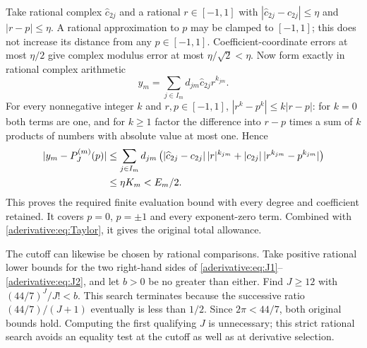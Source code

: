 \documentclass[11pt]{article}
\begin{document}
Take rational complex $\widehat c_{2j}$ and a rational
$r\in[-1,1]$ with
$|\widehat c_{2j}-c_{2j}|\le\eta$ and $|r-p|\le\eta$.
A rational approximation to $p$ may be clamped to $[-1,1]$;
this does not increase its distance from any $p\in[-1,1]$.
Coefficient-coordinate errors at most $\eta/2$ give
complex modulus error at most $\eta/\sqrt2<\eta$.
Now form exactly in rational complex arithmetic
\begin{equation}\label{aderivative:eq:rationaloutput}
y_m=\sum_{j\in I_m}d_{jm}\widehat c_{2j}r^{k_{jm}}.
\end{equation}
For every nonnegative integer $k$ and $r,p\in[-1,1]$,
$|r^k-p^k|\le k|r-p|$: for $k=0$ both terms are one,
and for $k\ge1$ factor the difference into $r-p$ times
a sum of $k$ products of numbers with absolute value at
most one. Hence
\begin{align}
|y_m-P_J^{(m)}(p)|
&\le\sum_{j\in I_m}d_{jm}
\left(|\widehat c_{2j}-c_{2j}|\,|r|^{k_{jm}}
+|c_{2j}|\,|r^{k_{jm}}-p^{k_{jm}}|\right)\notag\\
&\le\eta K_m<E_m/2.\label{aderivative:eq:evaluationbound}
\end{align}
This proves the required finite evaluation bound with
every degree and coefficient retained. It covers $p=0$,
$p=\pm1$ and every exponent-zero term. Combined with
\eqref{aderivative:eq:Taylor}, it gives the original total allowance.

The cutoff can likewise be chosen by rational comparisons.
Take positive rational lower bounds for the two right-hand
sides of \eqref{aderivative:eq:J1}--\eqref{aderivative:eq:J2}, and let $b>0$ be
no greater than either. Find $J\ge12$ with
$(44/7)^J/J!<b$. This search terminates because the
successive ratio $(44/7)/(J+1)$ eventually is less than
$1/2$. Since $2\pi<44/7$, both original bounds hold.
Computing the first qualifying $J$ is unnecessary; this
strict rational search avoids an equality test at the
cutoff as well as at derivative selection.
\end{document}
